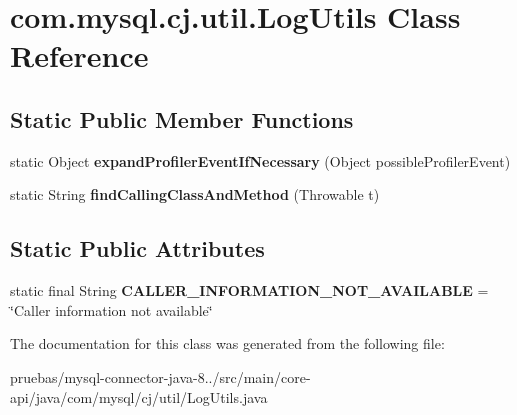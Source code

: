 \hypertarget{classcom_1_1mysql_1_1cj_1_1util_1_1_log_utils}{}\section{com.\+mysql.\+cj.\+util.\+Log\+Utils Class Reference}
\label{classcom_1_1mysql_1_1cj_1_1util_1_1_log_utils}
\subsection*{Static Public Member Functions}
\begin{DoxyCompactItemize}
\item 
\mbox{\label{classcom_1_1mysql_1_1cj_1_1util_1_1_log_utils_ab272d0bf97ff3ebf04de6b4b60048538}} 
static Object {\bfseries expand\+Profiler\+Event\+If\+Necessary} (Object possible\+Profiler\+Event)
\item 
\mbox{\label{classcom_1_1mysql_1_1cj_1_1util_1_1_log_utils_aa15ea38a6fed92c6cb4ebdd068791a4e}} 
static String {\bfseries find\+Calling\+Class\+And\+Method} (Throwable t)
\end{DoxyCompactItemize}
\subsection*{Static Public Attributes}
\begin{DoxyCompactItemize}
\item 
\mbox{\label{classcom_1_1mysql_1_1cj_1_1util_1_1_log_utils_a4523dd05d0aee6db8101d30781ecafb2}} 
static final String {\bfseries C\+A\+L\+L\+E\+R\+\_\+\+I\+N\+F\+O\+R\+M\+A\+T\+I\+O\+N\+\_\+\+N\+O\+T\+\_\+\+A\+V\+A\+I\+L\+A\+B\+LE} = \char`\"{}Caller information not available\char`\"{}
\end{DoxyCompactItemize}


The documentation for this class was generated from the following file\+:\begin{DoxyCompactItemize}
\item 
pruebas/mysql-\/connector-\/java-\/8../src/main/core-\/api/java/com/mysql/cj/util/Log\+Utils.\+java\end{DoxyCompactItemize}
